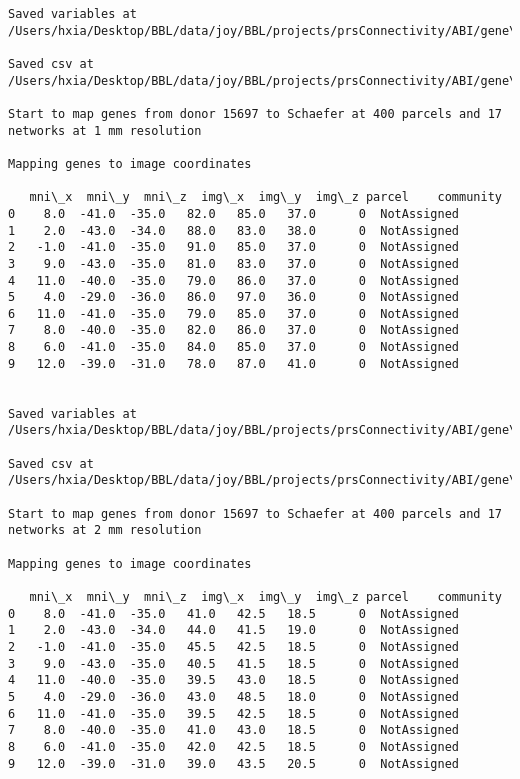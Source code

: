 \documentclass[11pt]{article}
\begin{document}
\begin{Verbatim}[commandchars=\\\{\}]
Saved variables at /Users/hxia/Desktop/BBL/data/joy/BBL/projects/prsConnectivity/ABI/gene\_mapping/15697donor\_400Parcels\_7Network\_2mm.pkl

Saved csv at /Users/hxia/Desktop/BBL/data/joy/BBL/projects/prsConnectivity/ABI/gene\_mapping/15697donor\_400Parcels\_7Network\_2mm.csv

Start to map genes from donor 15697 to Schaefer at 400 parcels and 17 networks at 1 mm resolution

Mapping genes to image coordinates

   mni\_x  mni\_y  mni\_z  img\_x  img\_y  img\_z parcel    community
0    8.0  -41.0  -35.0   82.0   85.0   37.0      0  NotAssigned
1    2.0  -43.0  -34.0   88.0   83.0   38.0      0  NotAssigned
2   -1.0  -41.0  -35.0   91.0   85.0   37.0      0  NotAssigned
3    9.0  -43.0  -35.0   81.0   83.0   37.0      0  NotAssigned
4   11.0  -40.0  -35.0   79.0   86.0   37.0      0  NotAssigned
5    4.0  -29.0  -36.0   86.0   97.0   36.0      0  NotAssigned
6   11.0  -41.0  -35.0   79.0   85.0   37.0      0  NotAssigned
7    8.0  -40.0  -35.0   82.0   86.0   37.0      0  NotAssigned
8    6.0  -41.0  -35.0   84.0   85.0   37.0      0  NotAssigned
9   12.0  -39.0  -31.0   78.0   87.0   41.0      0  NotAssigned


Saved variables at /Users/hxia/Desktop/BBL/data/joy/BBL/projects/prsConnectivity/ABI/gene\_mapping/15697donor\_400Parcels\_17Network\_1mm.pkl

Saved csv at /Users/hxia/Desktop/BBL/data/joy/BBL/projects/prsConnectivity/ABI/gene\_mapping/15697donor\_400Parcels\_17Network\_1mm.csv

Start to map genes from donor 15697 to Schaefer at 400 parcels and 17 networks at 2 mm resolution

Mapping genes to image coordinates

   mni\_x  mni\_y  mni\_z  img\_x  img\_y  img\_z parcel    community
0    8.0  -41.0  -35.0   41.0   42.5   18.5      0  NotAssigned
1    2.0  -43.0  -34.0   44.0   41.5   19.0      0  NotAssigned
2   -1.0  -41.0  -35.0   45.5   42.5   18.5      0  NotAssigned
3    9.0  -43.0  -35.0   40.5   41.5   18.5      0  NotAssigned
4   11.0  -40.0  -35.0   39.5   43.0   18.5      0  NotAssigned
5    4.0  -29.0  -36.0   43.0   48.5   18.0      0  NotAssigned
6   11.0  -41.0  -35.0   39.5   42.5   18.5      0  NotAssigned
7    8.0  -40.0  -35.0   41.0   43.0   18.5      0  NotAssigned
8    6.0  -41.0  -35.0   42.0   42.5   18.5      0  NotAssigned
9   12.0  -39.0  -31.0   39.0   43.5   20.5      0  NotAssigned



\end{Verbatim}
\end{document}
